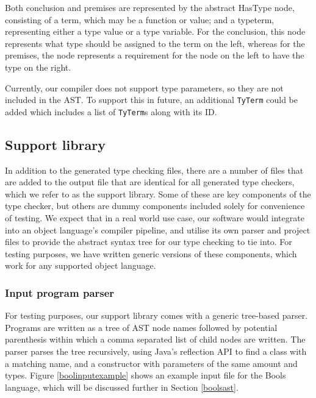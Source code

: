 \documentclass[nofilelist]{cslthse-msc}
\newcommand{\CR}[1]{\textcolor{green!60!black}{[\textbf{CR}:#1]}}
\begin{document}
Both conclusion and premises are represented by the abstract HasType node, consisting of a term, which may be a function or value; and a typeterm, representing either a type value or a type variable.
For the conclusion, this node represents what type should be assigned to the term on the left, whereas for the premises, the node represents a requirement for the node on the left to have the type on the right.

Currently, our compiler does not support type parameters, so they are not included in the AST.
To support this in future, an additional \lstinline{TyTerm} could be added which includes a list of \lstinline{TyTerm}s along with its ID.

\subsection{Support library}
In addition to the generated type checking files, there are a number of files that are added to the output file that are identical for all generated type checkers, which we refer to as the support library.
Some of these are key components of the type checker, but others are dummy components included solely for convenience of testing.
We expect that in a real world use case, our software would integrate into an object language's compiler pipeline, and utilise its own parser and project files to provide the abstract syntax tree for our type checking to tie into.
For testing purposes, we have written generic versions of these components, which work for any supported object language.

\subsubsection{Input program parser}\label{treebasedparser}
For testing purposes, our support library comes with a generic tree-based parser.
Programs are written as a tree of AST node names followed by potential parenthesis within which a comma separated list of child nodes are written.
The parser parses the tree recursively, using Java's reflection API to find a class with a matching name, and a constructor with parameters of the same amount and types.
Figure \ref{boolinputexample} shows an example input file for the Bools language, which will be discussed further in Section \ref{boolsast}.
\end{document}

